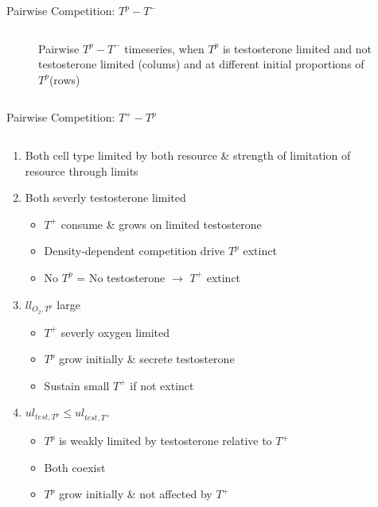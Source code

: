 \documentclass[aspectratio=169,9pt]{beamer}
\begin{document}
\begin{frame}{Pairwise Competition: $T^p - T^-$}
\begin{columns}
\begin{column}{0.5\textwidth}
\begin{figure}[h]
        \caption{Pairwise $T^p - T^-$ timeseries, when $T^p$ is testosterone limited and not testosterone limited (colums) and at different initial proportions of $T^p$(rows)}
        \label{fig_Tpro-Tneg}
      \end{figure}
    \end{column}
  \end{columns}
\end{frame}

\begin{frame}{Pairwise Competition: $T^+ - T^p$}
  \begin{columns}
    \begin{column}{0.6\textwidth}
      \begin{enumerate}
        \item<1-> Both cell type limited by both resource
        \& strength of limitation of resource through limits
        \item<2-> Both severly testosterone limited
        \begin{itemize}
          \item $T^+$ consume \& grows on limited testosterone
          \item Density-dependent competition drive $T^p$ extinct
          \item No $T^p$ = No testosterone $\rightarrow$ $T^+$ extinct
        \end{itemize}
        \item<3-> $ll_{O_2,T^p}$ large
        \begin{itemize}
          \item $T^+$ severly oxygen limited
          \item $T^p$ grow initially \& secrete testosterone
          \item Sustain small $T^+$ if not extinct
        \end{itemize}
        \item<4-> $ul_{test,T^p} \leq ul_{test,T^+}$
        \begin{itemize}
          \item $T^p$ is weakly limited by testosterone relative to $T^+$
          \item Both coexist
          \item $T^p$ grow initially \& not affected by $T^+$
        \end{itemize}
      \end{enumerate}
    \end{column}
    \begin{column}{0.4\textwidth}

\end{column}
\end{columns}
\end{frame}
\end{document}
